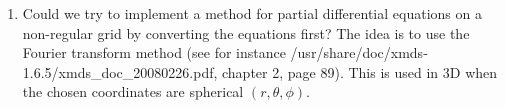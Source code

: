 \begin{enumerate}
\item Could we try to implement a method for partial differential equations on a non-regular grid  by converting the equations first? The idea is to use the Fourier transform method (see for instance /usr/share/doc/xmds-1.6.5/xmds_doc_20080226.pdf, chapter 2, page 89). This is used in 3D when the chosen coordinates are spherical $(r,\theta,\phi)$.
\end{enumerate}
